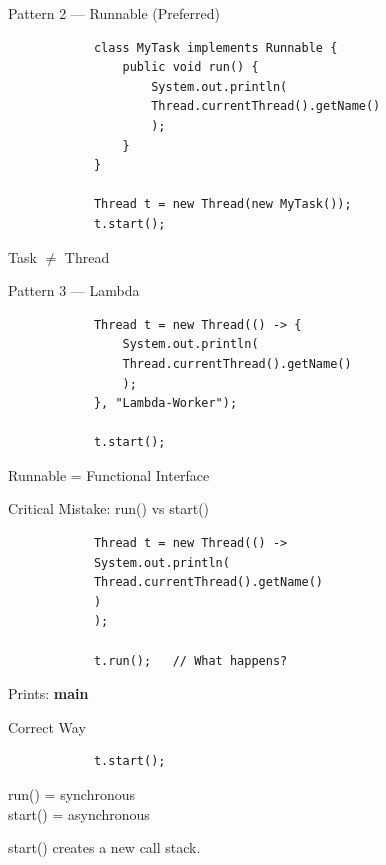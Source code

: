 \documentclass[aspectratio=169,11pt]{beamer}
\begin{document}
	\begin{frame}[fragile]{Pattern 2 — Runnable (Preferred)}
		\begin{lstlisting}
			class MyTask implements Runnable {
				public void run() {
					System.out.println(
					Thread.currentThread().getName()
					);
				}
			}
			
			Thread t = new Thread(new MyTask());
			t.start();
		\end{lstlisting}
		
		\begin{center}
			\Large
			Task $\neq$ Thread
		\end{center}
	\end{frame}
	
	\begin{frame}[fragile]{Pattern 3 — Lambda}
		\begin{lstlisting}
			Thread t = new Thread(() -> {
				System.out.println(
				Thread.currentThread().getName()
				);
			}, "Lambda-Worker");
			
			t.start();
		\end{lstlisting}
		
		Runnable = Functional Interface
	\end{frame}
	
	\begin{frame}[fragile]{Critical Mistake: run() vs start()}
		\begin{lstlisting}
			Thread t = new Thread(() ->
			System.out.println(
			Thread.currentThread().getName()
			)
			);
			
			t.run();   // What happens?
		\end{lstlisting}
		
		\pause
		
		\begin{center}
			Prints: \textbf{main}
		\end{center}
	\end{frame}
	
	\begin{frame}[fragile]{Correct Way}
		\begin{lstlisting}
			t.start();
		\end{lstlisting}
		
		\begin{center}
			\Large
			run() = synchronous \\
			start() = asynchronous
		\end{center}
		
		\vspace{4mm}
		
		start() creates a new call stack.
	\end{frame}
	
\end{document}
